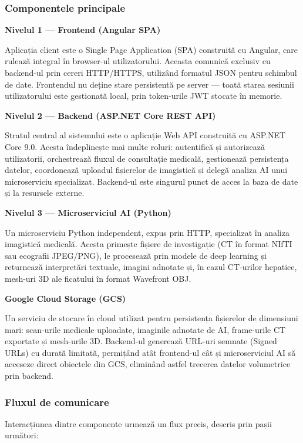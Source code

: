 \documentclass[12pt, a4paper]{report}
\begin{document}
\subsubsection{Componentele principale}

\textbf{Nivelul 1 --- Frontend (Angular SPA)}

Aplicația client este o Single Page Application (SPA) construită cu Angular, care rulează
integral în browser-ul utilizatorului. Aceasta comunică exclusiv cu backend-ul prin cereri
HTTP/HTTPS, utilizând formatul JSON pentru schimbul de date. Frontendul nu deține stare
persistentă pe server --- toată starea sesiunii utilizatorului este gestionată local, prin
token-urile JWT stocate în memorie.

\textbf{Nivelul 2 --- Backend (ASP.NET Core REST API)}

Stratul central al sistemului este o aplicație Web API construită cu ASP.NET Core 9.0.
Acesta îndeplinește mai multe roluri: autentifică și autorizează utilizatorii, orchestrează
fluxul de consultație medicală, gestionează persistența datelor, coordonează uploadul
fișierelor de imagistică și delegă analiza AI unui microserviciu specializat. Backend-ul
este singurul punct de acces la baza de date și la resursele externe.

\textbf{Nivelul 3 --- Microserviciul AI (Python)}

Un microserviciu Python independent, expus prin HTTP, specializat în analiza imagistică
medicală. Acesta primește fișiere de investigație (CT în format NIfTI sau ecografii
JPEG/PNG), le procesează prin modele de deep learning și returnează interpretări textuale,
imagini adnotate și, în cazul CT-urilor hepatice, mesh-uri 3D ale ficatului în format
Wavefront OBJ.

\textbf{Google Cloud Storage (GCS)}

Un serviciu de stocare în cloud utilizat pentru persistența fișierelor de dimensiuni mari:
scan-urile medicale uploadate, imaginile adnotate de AI, frame-urile CT exportate și
mesh-urile 3D. Backend-ul generează URL-uri semnate (Signed URLs) cu durată limitată,
permițând atât frontend-ul cât și microserviciul AI să acceseze direct obiectele din GCS,
eliminând astfel trecerea datelor volumetrice prin backend.

\subsubsection{Fluxul de comunicare}

Interacțiunea dintre componente urmează un flux precis, descris prin pașii următori:
\end{document}
